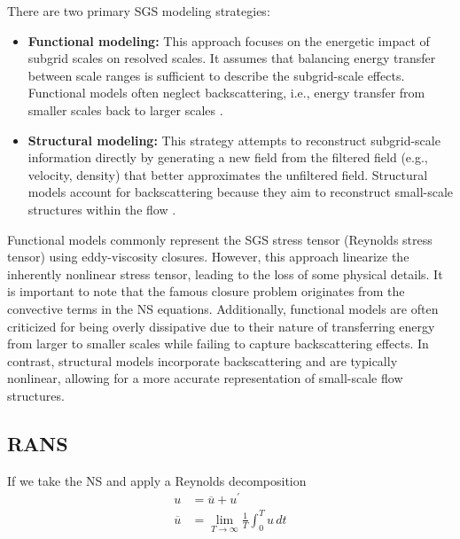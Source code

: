 There are two primary \gls{SGS} modeling strategies:
\begin{itemize}
    \item \textbf{Functional modeling:} This approach focuses on the energetic
        impact of subgrid scales on resolved scales. It assumes that balancing
        energy transfer between scale ranges is sufficient to describe the
        subgrid-scale effects. Functional models often neglect backscattering,
        i.e., energy transfer from smaller scales back to larger scales
        \cite{Burton2005}.
    \item \textbf{Structural modeling:} This strategy attempts to reconstruct
        subgrid-scale information directly by generating a new field from the
        filtered field (e.g., velocity, density) that better approximates the
        unfiltered field. Structural models account for backscattering because
        they aim to reconstruct small-scale structures within the
        flow \cite{Burton2005}.
\end{itemize}

Functional models commonly represent the \gls{SGS} stress tensor (Reynolds
stress tensor) using eddy-viscosity closures. However, this approach linearize
the inherently nonlinear stress tensor, leading to the loss of some physical
details. It is important to note that the famous closure problem originates
from the convective terms in the \gls{NS} equations. Additionally, functional
models are often criticized for being overly dissipative due to their nature of
transferring energy from larger to smaller scales while failing to capture
backscattering effects. In contrast, structural models incorporate
backscattering and are typically nonlinear, allowing for a more accurate
representation of small-scale flow structures. 

\subsection{\acrfull{RANS}}
If we take the \gls{NS}  and apply a
Reynolds decomposition 
\begin{subequations}
    \begin{align}
        u &= \overline{u} + u^{\prime}\label{eq:reynoldsDecomposition} \\
        \overline{u} &= \lim_{T\rightarrow\infty}\frac{1}{T}\int^T_0 u\,dt \label{eq:timeAverage}
    \end{align}
\end{subequations}

